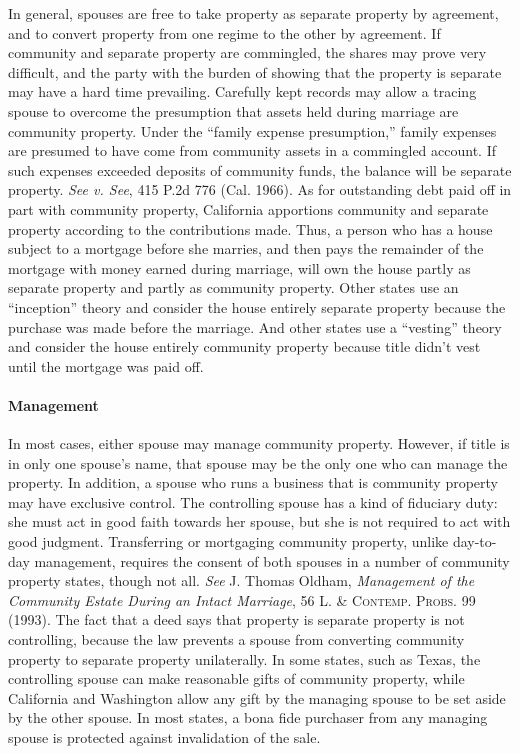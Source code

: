 In general, spouses are free to take property as separate property by agreement,
and to convert property from one regime to the other by agreement. If
community and separate property are commingled,  the shares may
prove
very difficult, and the party with the burden of showing that the property is
separate may have a hard time prevailing. Carefully kept records may allow a
tracing spouse to overcome the presumption that assets held during marriage are
community property. Under the ``family expense presumption,'' family expenses
are presumed to have come from community assets in a commingled account. If
such expenses exceeded deposits of community funds, the balance will be
separate property. \emph{See v. See}, 415 P.2d 776 (Cal. 1966). As for
outstanding debt paid off in part with community property, California apportions
community and separate property according to the contributions made. Thus, a
person who has a house subject to a mortgage before she marries, and then pays
the remainder of the mortgage with money earned during marriage, will own the
house partly as separate property and partly as community property. Other states
use an ``inception'' theory and consider the house entirely separate property
because the purchase was made before the marriage. And other states use a
``vesting'' theory and consider the house entirely community property because
title didn't vest until the mortgage was paid off.

\paragraph{Management}
In most cases, either spouse may manage community property. However, if title
is in only one spouse's name, that spouse may be the only one who can manage
the property. In addition, a spouse who runs a business that is community
property may have exclusive control. The controlling spouse has a kind of
fiduciary duty: she must act in good faith towards her spouse, but she is not
required to act with good judgment. Transferring or mortgaging community
property, unlike day-to-day management, requires the consent of both spouses in
a number of community property states, though not all. \textit{See} J. Thomas
Oldham, \textit{Management of the Community Estate During an Intact Marriage},
56 \textsc{L. \& Contemp. Probs.} 99 (1993). The fact that a deed says that
property is separate property is not controlling, because the law prevents a
spouse from converting community property to separate property unilaterally.
In some states, such as Texas, the controlling spouse can make reasonable gifts
of community property, while California and Washington allow any gift by the
managing spouse to be set aside by the other spouse. In most states, a bona
fide purchaser from any managing spouse is protected against invalidation of
the sale.

